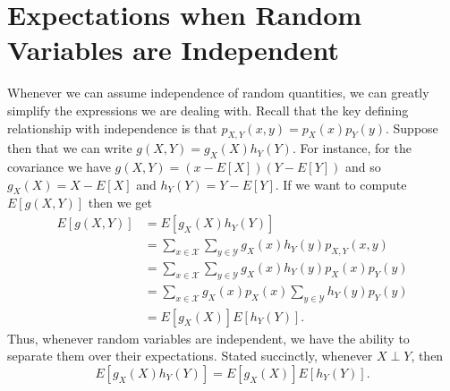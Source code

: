\documentclass[
  letterpaper,
  DIV=11,
  numbers=noendperiod]{scrreprt}
\theoremstyle{definition}
\theoremstyle{definition}
\theoremstyle{definition}
\theoremstyle{remark}
\begin{document}
\section{Expectations when Random Variables are
Independent}\label{expectations-when-random-variables-are-independent}

Whenever we can assume independence of random quantities, we can greatly
simplify the expressions we are dealing with. Recall that the key
defining relationship with independence is that
\(p_{X,Y}(x,y) = p_X(x)p_Y(y)\). Suppose then that we can write
\(g(X,Y) = g_X(X)h_Y(Y)\). For instance, for the covariance we have
\(g(X,Y)=(x-E[X])(Y-E[Y])\) and so \(g_X(X) = X-E[X]\) and
\(h_Y(Y) = Y-E[Y]\). If we want to compute \(E[g(X,Y)]\) then we get
\begin{align*}
E[g(X,Y)] &= E[g_X(X)h_Y(Y)] \\
&= \sum_{x\in\mathcal{X}}\sum_{y\in\mathcal{Y}}g_X(x)h_Y(y)p_{X,Y}(x,y) \\
&= \sum_{x\in\mathcal{X}}\sum_{y\in\mathcal{Y}}g_X(x)h_Y(y)p_X(x)p_Y(y) \\
&=\sum_{x\in\mathcal{X}}g_X(x)p_X(x)\sum_{y\in\mathcal{Y}}h_Y(y)p_Y(y)\\
&= E[g_X(X)]E[h_Y(Y)].\end{align*} Thus, whenever random variables are
independent, we have the ability to separate them over their
expectations. Stated succinctly, whenever \(X\perp Y\), then
\[E[g_X(X)h_Y(Y)] = E[g_X(X)]E[h_Y(Y)].\]
\end{document}
